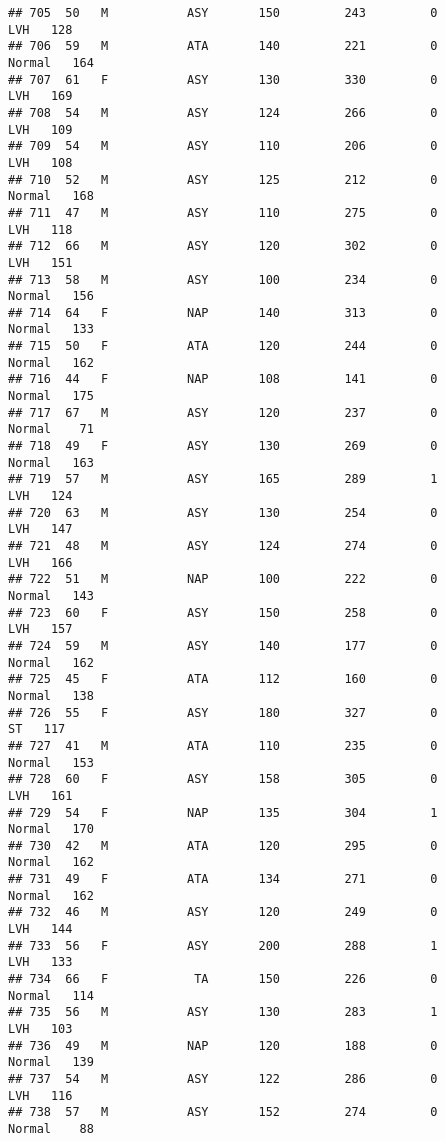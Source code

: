 \documentclass[
]{article}
\begin{document}
\begin{verbatim}
## 705  50   M           ASY       150         243         0        LVH   128
## 706  59   M           ATA       140         221         0     Normal   164
## 707  61   F           ASY       130         330         0        LVH   169
## 708  54   M           ASY       124         266         0        LVH   109
## 709  54   M           ASY       110         206         0        LVH   108
## 710  52   M           ASY       125         212         0     Normal   168
## 711  47   M           ASY       110         275         0        LVH   118
## 712  66   M           ASY       120         302         0        LVH   151
## 713  58   M           ASY       100         234         0     Normal   156
## 714  64   F           NAP       140         313         0     Normal   133
## 715  50   F           ATA       120         244         0     Normal   162
## 716  44   F           NAP       108         141         0     Normal   175
## 717  67   M           ASY       120         237         0     Normal    71
## 718  49   F           ASY       130         269         0     Normal   163
## 719  57   M           ASY       165         289         1        LVH   124
## 720  63   M           ASY       130         254         0        LVH   147
## 721  48   M           ASY       124         274         0        LVH   166
## 722  51   M           NAP       100         222         0     Normal   143
## 723  60   F           ASY       150         258         0        LVH   157
## 724  59   M           ASY       140         177         0     Normal   162
## 725  45   F           ATA       112         160         0     Normal   138
## 726  55   F           ASY       180         327         0         ST   117
## 727  41   M           ATA       110         235         0     Normal   153
## 728  60   F           ASY       158         305         0        LVH   161
## 729  54   F           NAP       135         304         1     Normal   170
## 730  42   M           ATA       120         295         0     Normal   162
## 731  49   F           ATA       134         271         0     Normal   162
## 732  46   M           ASY       120         249         0        LVH   144
## 733  56   F           ASY       200         288         1        LVH   133
## 734  66   F            TA       150         226         0     Normal   114
## 735  56   M           ASY       130         283         1        LVH   103
## 736  49   M           NAP       120         188         0     Normal   139
## 737  54   M           ASY       122         286         0        LVH   116
## 738  57   M           ASY       152         274         0     Normal    88

\end{verbatim}
\end{document}
